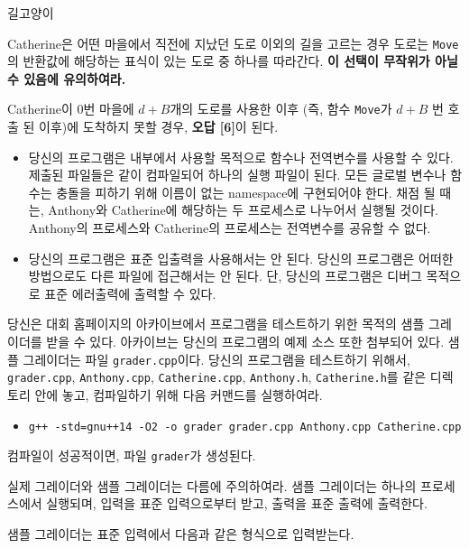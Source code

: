 \begin{problem}{길고양이}
\begin{itemize}
		Catherine은 어떤 마을에서 직전에 지났던 도로 이외의 길을 고르는 경우 도로는 \texttt{Move}의 반환값에 해당하는 표식이 있는 도로 중 하나를 따라간다. \textbf{이 선택이 무작위가 아닐 수 있음에 유의하여라.}
		
		Catherine이 $0$번 마을에 $d+B$개의 도로를 사용한 이후 (즉, 함수 \texttt{Move}가 $d+B$ 번 호출 된 이후)에 도착하지 못할 경우, \textbf{오답 [6]}이 된다.
		
	\end{itemize}
	

	\Notes
	
	\begin{itemize}
		\item 당신의 프로그램은 내부에서 사용할 목적으로 함수나 전역변수를 사용할 수 있다. 제출된 파일들은 같이 컴파일되어 하나의 실행 파일이 된다. 모든 글로벌 변수나 함수는 충돌을 피하기 위해 이름이 없는 namespace에 구현되어야 한다. 채점 될 때는, Anthony와 Catherine에 해당하는 두 프로세스로 나누어서 실행될 것이다. Anthony의 프로세스와 Catherine의 프로세스는 전역변수를 공유할 수 없다.
		\item 당신의 프로그램은 표준 입출력을 사용해서는 안 된다. 당신의 프로그램은 어떠한 방법으로도 다른 파일에 접근해서는 안 된다. 단, 당신의 프로그램은 디버그 목적으로 표준 에러출력에 출력할 수 있다.
	\end{itemize}
	
	당신은 대회 홈페이지의 아카이브에서 프로그램을 테스트하기 위한 목적의 샘플 그레이더를 받을 수 있다. 아카이브는 당신의 프로그램의 예제 소스 또한 첨부되어 있다.
	샘플 그레이더는 파일 \texttt{grader.cpp}이다. 당신의 프로그램을 테스트하기 위해서, \texttt{grader.cpp}, \texttt{Anthony.cpp}, \texttt{Catherine.cpp}, \texttt{Anthony.h}, \texttt{Catherine.h}를 같은 디렉토리 안에 놓고, 컴파일하기 위해 다음 커맨드를 실행하여라.
	
	\begin{itemize}
		\item \texttt{g++ -std=gnu++14 -O2 -o grader grader.cpp Anthony.cpp Catherine.cpp}
	\end{itemize}
	
	컴파일이 성공적이면, 파일 \texttt{grader}가 생성된다.
	
	실제 그레이더와 샘플 그레이더는 다름에 주의하여라. 샘플 그레이더는 하나의 프로세스에서 실행되며, 입력을 표준 입력으로부터 받고, 출력을 표준 출력에 출력한다.
	
	\InputFile
	
	샘플 그레이더는 표준 입력에서 다음과 같은 형식으로 입력받는다.
	

\end{problem}
